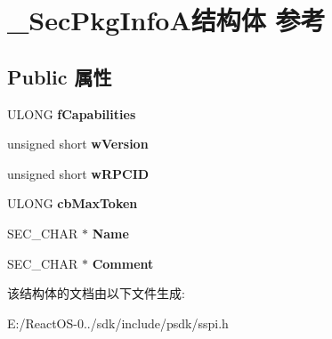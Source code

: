 \hypertarget{struct___sec_pkg_info_a}{}\section{\+\_\+\+Sec\+Pkg\+Info\+A结构体 参考}
\label{struct___sec_pkg_info_a}
\subsection*{Public 属性}
\begin{DoxyCompactItemize}
\item 
\mbox{\label{struct___sec_pkg_info_a_aa6b0025b7f9973cf04d195332538c8de}} 
U\+L\+O\+NG {\bfseries f\+Capabilities}
\item 
\mbox{\label{struct___sec_pkg_info_a_a7284f45e83f16908d4230fde55ede54f}} 
unsigned short {\bfseries w\+Version}
\item 
\mbox{\label{struct___sec_pkg_info_a_acd9287c1938801484b66a267533b3290}} 
unsigned short {\bfseries w\+R\+P\+C\+ID}
\item 
\mbox{\label{struct___sec_pkg_info_a_a9025b27fb6dfee6c722a4b90524a244d}} 
U\+L\+O\+NG {\bfseries cb\+Max\+Token}
\item 
\mbox{\label{struct___sec_pkg_info_a_a5d7e041c96fae7a6564bd9dfb2943517}} 
S\+E\+C\+\_\+\+C\+H\+AR $\ast$ {\bfseries Name}
\item 
\mbox{\label{struct___sec_pkg_info_a_a04bbbff96a90ec5e49e90bd59cc6351d}} 
S\+E\+C\+\_\+\+C\+H\+AR $\ast$ {\bfseries Comment}
\end{DoxyCompactItemize}


该结构体的文档由以下文件生成\+:\begin{DoxyCompactItemize}
\item 
E\+:/\+React\+O\+S-\/0../sdk/include/psdk/sspi.\+h\end{DoxyCompactItemize}
